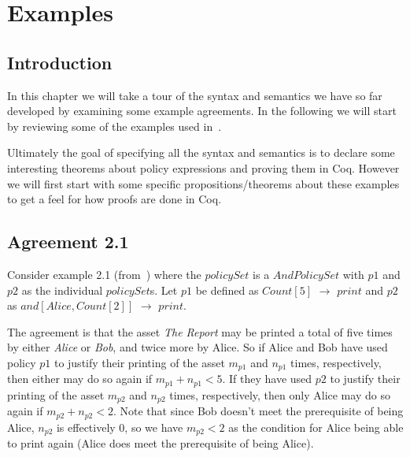 \chapter{Examples}\label{chap:examples}


\section{Introduction}


In this chapter we will take a tour of the syntax and semantics we have so far developed by examining some example agreements. In the following we will start by reviewing some of the examples used in~\cite{pucella2006}.

Ultimately the goal of specifying all the syntax and semantics is to declare some interesting theorems about policy expressions and proving them in Coq. However we will first start with some specific propositions/theorems about these examples to get a feel for how proofs are done in Coq.

\section{Agreement 2.1}

Consider example 2.1 (from~\cite{pucella2006}) where the $policySet$ is a $AndPolicySet$ with $p1$ and $p2$ as the individual $policySet$s. Let $p1$ be defined as $Count[5]$ $\rightarrow$ $print$ and $p2$ as $and[Alice, Count[2]]$ $\rightarrow$ $print$. 

The agreement is that the asset \emph{The Report} may be printed a total of five times by either \emph{Alice} or \emph{Bob}, and twice more by Alice. So if Alice and Bob have used policy $p1$ to justify their printing of the asset $m_{p1}$ and $n_{p1}$ times, respectively, then either may do so again if $m_{p1} + n_{p1} < 5$. If they have used $p2$ to justify their printing of the asset $m_{p2}$ and $n_{p2}$ times, respectively, then only Alice may do so again if $m_{p2} + n_{p2} < 2$. Note that since Bob doesn't meet the prerequisite of being Alice, $n_{p2}$ is effectively $0$, so we have $m_{p2} < 2$ as the condition for Alice being able to print again (Alice does meet the prerequisite of being Alice).

